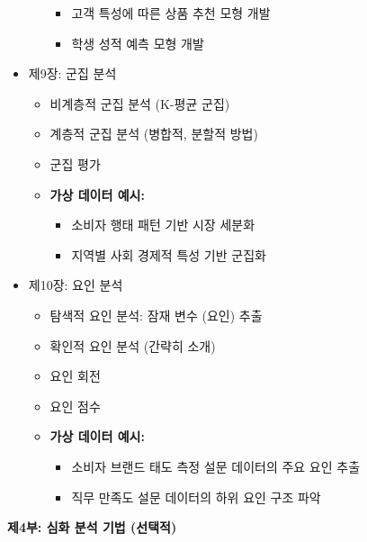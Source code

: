 \documentclass[
  letterpaper,
]{book}
\providecommand{\tightlist}{%
  \setlength{\itemsep}{0pt}\setlength{\parskip}{0pt}}
\begin{document}
\begin{itemize}
\begin{itemize}
    \begin{itemize}
    \tightlist
    \item
      고객 특성에 따른 상품 추천 모형 개발
    \item
      학생 성적 예측 모형 개발
    \end{itemize}
  \end{itemize}
\item
  제9장: 군집 분석

  \begin{itemize}
  \tightlist
  \item
    비계층적 군집 분석 (K-평균 군집)
  \item
    계층적 군집 분석 (병합적, 분할적 방법)
  \item
    군집 평가
  \item
    \textbf{가상 데이터 예시:}

    \begin{itemize}
    \tightlist
    \item
      소비자 행태 패턴 기반 시장 세분화
    \item
      지역별 사회 경제적 특성 기반 군집화
    \end{itemize}
  \end{itemize}
\item
  제10장: 요인 분석

  \begin{itemize}
  \tightlist
  \item
    탐색적 요인 분석: 잠재 변수 (요인) 추출
  \item
    확인적 요인 분석 (간략히 소개)
  \item
    요인 회전
  \item
    요인 점수
  \item
    \textbf{가상 데이터 예시:}

    \begin{itemize}
    \tightlist
    \item
      소비자 브랜드 태도 측정 설문 데이터의 주요 요인 추출
    \item
      직무 만족도 설문 데이터의 하위 요인 구조 파악
    \end{itemize}
  \end{itemize}
\end{itemize}

\textbf{제4부: 심화 분석 기법 (선택적)}
\end{document}

